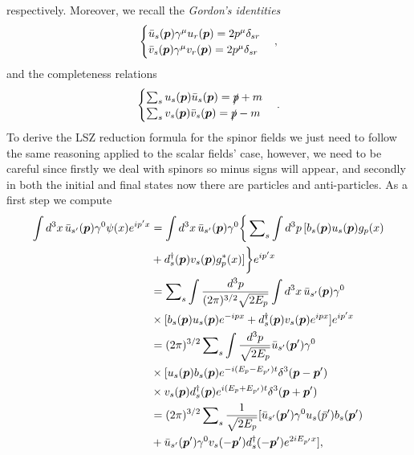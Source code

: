respectively. Moreover, we recall the \emph{Gordon's identities}
\begin{equation}
    \begin{cases}
        \bar{u}_s(\bm{p})\gamma^\mu u_r(\bm{p}) = 2p^\mu\delta_{sr} \\
        \bar{v}_s(\bm{p})\gamma^\mu v_r(\bm{p}) = 2p^\mu\delta_{sr}
    \end{cases},
\end{equation}
and the completeness relations 
\begin{equation}
\label{eq: spinor's completeness relations}
    \begin{cases}
        \sum\nolimits_s u_s(\bm{p})\bar{u}_s(\bm{p}) = \slashed{p} + m \\
        \sum\nolimits_s v_s(\bm{p})\bar{v}_s(\bm{p}) = \slashed{p} - m
    \end{cases}.
\end{equation}
To derive the LSZ reduction formula for the spinor fields we just need to follow the same reasoning applied to the scalar fields' case, however, we need to be careful since firstly we deal with spinors so minus signs will appear, and secondly in both the initial and final states now there are particles and anti-particles. As a first step we compute 
\begin{equation}
    \begin{split}
        \int d^3x\,\bar{u}_{s'}(\bm{p})\gamma^0\psi(x)e^{ip'x} &= \int d^3x\,\bar{u}_{s'}(\bm{p})\gamma^0\bigg\{\sum\nolimits_{s}\int d^3p\,[b_s(\bm{p})u_s(\bm{p})g_p(x) \\
        &+ d^\dagger_s(\bm{p})v_s(\bm{p})g_p^*(x)]\bigg\}e^{ip'x} \\
        &= \sum\nolimits_s\int \frac{d^3p}{(2\pi)^{3/2}\sqrt{2E_p}}\int d^3x\,\bar{u}_{s'}(\bm{p})\gamma^0 \\
        &\times [b_s(\bm{p})u_s(\bm{p})e^{-ipx} + d^\dagger_s(\bm{p})v_s(\bm{p})e^{ipx}]e^{ip'x} \\
        &= (2\pi)^{3/2}\sum\nolimits_s\int\frac{d^3p}{\sqrt{2E_p}}\bar{u}_{s'}(\bm{p}')\gamma^0 \\
        &\times [u_s(\bm{p})b_s(\bm{p})e^{-i(E_p - E_{p'})t}\delta^3(\bm{p} - \bm{p}') \\
        &\times v_s(\bm{p})d^\dagger_s(\bm{p})e^{i(E_p + E_{p'})t}\delta^3(\bm{p} + \bm{p}') \\
        &= (2\pi)^{3/2}\sum\nolimits_s\frac{1}{\sqrt{2E_p}}[\bar{u}_{s'}(\bm{p}')\gamma^0u_s(\bar{p}')b_s(\bm{p}') \\
        &+ \bar{u}_{s'}(\bm{p}')\gamma^0v_s(-\bm{p}')d^\dagger_s(-\bm{p}')e^{2iE_{p'}x}],
    \end{split}
\end{equation}
